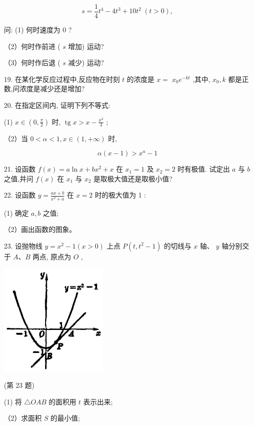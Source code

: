 \documentclass[lang=cn,newtx,12pt,scheme=chinese]{elegantbook}
\begin{document}
\[
s = \frac{1}{4}{t}^{4} - 4{t}^{3} + {10}{t}^{2}\;\left( {t > 0}\right) ,
\]

问: (1) 何时速度为 \(0\) ?

（2）何时作前进 ( \(s\) 增加) 运动?

（3）何时作后退 ( \(s\) 减少) 运动?

19. 在某化学反应过程中,反应物在时刻 \(t\) 的浓度是 \(x =\) \({x}_{0}{e}^{-{kt}}\) ,其中, \({x}_{0},k\) 都是正数,问浓度是减少还是增加?

20. 在指定区间内, 证明下列不等式:

(1) \(x \in \left( {0,\frac{\pi }{2}}\right)\) 时, \(\operatorname{tg}x > x - \frac{{x}^{3}}{3}\) ;

（2）当 \(0 < \alpha < 1,x \in \left( {1, + \infty }\right)\) 时,

\[
\alpha \left( {x - 1}\right) > {x}^{a} - 1
\]

21. 设函数 \(f\left( x\right) = a\ln x + b{x}^{2} + x\) 在 \({x}_{1} = 1\) 及 \({x}_{2} = 2\) 时有极值. 试定出 \(a\) 与 \(b\) 之值,并问 \(f\left( x\right)\) 在 \({x}_{1}\) 与 \({x}_{2}\) 是取极大值还是取极小值?

22. 设函数 \(y = \frac{{ax} + b}{{x}^{2} + a}\) 在 \(x = 2\) 时的极大值为 1 :

(1) 确定 \(a,b\) 之值;

（2）画出函数的图象。

23. 设抛物线 \(y = {x}^{2} - 1\left( {x > 0}\right)\) 上点 \(P\left( {t,{t}^{2} - 1}\right)\) 的切线与 \(x\) 轴、 \(y\) 轴分别交于 \(A\text{、}B\) 两点, 原点为 \(O\) ,

\begin{center}
\includegraphics[max width=0.4\textwidth]{images/01912c18-5c3f-733d-b775-749ba9897a9d_182_738738.jpg}
\end{center}

(第 23 题)

(1) 将 \(\bigtriangleup {OAB}\) 的面积用 \(t\) 表示出来;

（2）求面积 \(S\) 的最小值;
\end{document}
